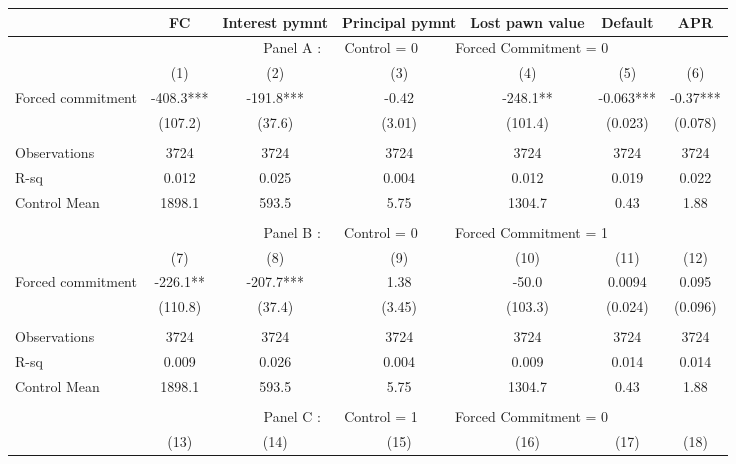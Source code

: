 \begin{tabular}{lcccccc}
\toprule
      & FC    & Interest pymnt & Principal pymnt & Lost pawn value & Default & APR \\
\midrule
      & \multicolumn{6}{c}{Panel A : $\quad$ Control  = 0           $\quad\quad$                  Forced Commitment = 0} \\
\midrule
\midrule
      & (1)   & (2)   & (3)   & (4)   & (5)   & (6) \\
\midrule
\midrule
Forced commitment  & -408.3*** & -191.8*** & -0.42 & -248.1** & -0.063*** & -0.37*** \\
      & (107.2) & (37.6) & (3.01) & (101.4) & (0.023) & (0.078) \\
      &       &       &       &       &       &  \\
\midrule
Observations & 3724  & 3724  & 3724  & 3724  & 3724  & 3724 \\
R-sq  & 0.012 & 0.025 & 0.004 & 0.012 & 0.019 & 0.022 \\
Control Mean & 1898.1 & 593.5 & 5.75  & 1304.7 & 0.43  & 1.88 \\
\midrule
\midrule
      &       &       &       &       &       &  \\
\midrule
      & \multicolumn{6}{c}{Panel B : $\quad$ Control  = 0         $\quad\quad$                    Forced Commitment = 1} \\
\midrule
\midrule
      & (7)   & (8)   & (9)   & (10)  & (11)  & (12) \\
\midrule
\midrule
Forced commitment  & -226.1** & -207.7*** & 1.38  & -50.0 & 0.0094 & 0.095 \\
      & (110.8) & (37.4) & (3.45) & (103.3) & (0.024) & (0.096) \\
      &       &       &       &       &       &  \\
\midrule
Observations & 3724  & 3724  & 3724  & 3724  & 3724  & 3724 \\
R-sq  & 0.009 & 0.026 & 0.004 & 0.009 & 0.014 & 0.014 \\
Control Mean & 1898.1 & 593.5 & 5.75  & 1304.7 & 0.43  & 1.88 \\
\midrule
\midrule
      &       &       &       &       &       &  \\
\midrule
      & \multicolumn{6}{c}{Panel C : $\quad$ Control  = 1        $\quad\quad$                     Forced Commitment = 0} \\
\midrule
\midrule
      & (13)  & (14)  & (15)  & (16)  & (17)  & (18) \\

\end{tabular}
